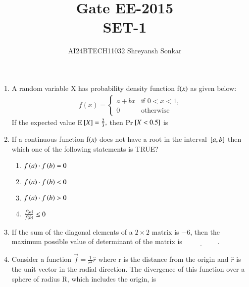 \documentclass[journal]{IEEEtran}
\begin{document}

\vspace{3cm}


\renewcommand{\thefigure}{\theenumi}
\renewcommand{\thetable}{\theenumi}
\setlength{\intextsep}{10pt} %


\renewcommand{\thetable}{\theenumi}

\title{Gate EE-2015\\ SET-1}
\author{AI24BTECH11032 Shreyansh Sonkar
}
\maketitle
\renewcommand{\thefigure}{\theenumi}
\renewcommand{\thetable}{\theenumi}
\begin{enumerate}
    \item  A random variable X has probability density function f$\left(x\right)$ as given below:
\begin{align*}
    f(x) = 
    \begin{cases} 
      a + b x & \text{if } 0 < x < 1, \\
      0 & \text{otherwise}
   \end{cases}
\end{align*}
If the expected value E${}\left[X\right]=\frac{2}{3},$ then Pr${}\left[X<0.5\right]$ is
\bigskip
\item If a continuous function f$\left(x\right)$ does not have a root in the interval ${}\left[a,b\right]$ then which one of the following statements is TRUE?
\begin{enumerate}
    \item $f\left(a\right)\cdot f\left(b\right)=0$
    \item $f\left(a\right)\cdot f\left(b\right)<0$
    \item $f\left(a\right)\cdot f\left(b\right)>0$
    \item $\frac{f\left(a\right)} {f\left(b\right)}\leq0$
\end{enumerate}
\bigskip
\item If the sum of the diagonal elements of a $2\times2$ matrix is $-6$, then the maximum possible value of determinant of the matrix is $\underline{\hspace{2cm}}.$
\bigskip
\item Consider a function $\overrightarrow{f}=\frac{1}{r^{2}}\hat{r}$ where r is the distance from the origin and $\hat{r}$ is the unit vector in the radial direction. The divergence of this function over a sphere of radius R, which includes the origin, is
\begin{multicols}{4}

\end{multicols}
\end{enumerate}
\end{document}
